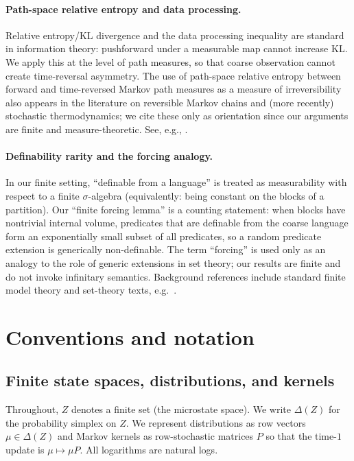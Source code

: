 \documentclass[11pt]{article}
\theoremstyle{remark}
\begin{document}
\paragraph{Path-space relative entropy and data processing.}
Relative entropy/KL divergence and the data processing inequality are standard in information theory:
pushforward under a measurable map cannot increase KL. We apply this at the level of path measures,
so that coarse observation cannot create time-reversal asymmetry.
The use of path-space relative entropy between forward and time-reversed Markov path measures as a
measure of irreversibility also appears in the literature on reversible Markov chains and (more
recently) stochastic thermodynamics; we cite these only as orientation since our arguments are finite
and measure-theoretic. See, e.g., \cite{CoverThomas2006,CsiszarKorner2011,Kelly1979,Seifert2012}.

\paragraph{Definability rarity and the forcing analogy.}
In our finite setting, ``definable from a language'' is treated as measurability with respect to a
finite $\sigma$-algebra (equivalently: being constant on the blocks of a partition). Our ``finite
forcing lemma'' is a counting statement: when blocks have nontrivial internal volume, predicates that
are definable from the coarse language form an exponentially small subset of all predicates, so a
random predicate extension is generically non-definable.
The term ``forcing'' is used only as an analogy to the role of generic extensions in set theory; our
results are finite and do not invoke infinitary semantics. Background references include standard
finite model theory and set-theory texts, e.g.\ \cite{Libkin2004,Cohen1963,Kunen2011}.

\section{Conventions and notation}
\subsection{Finite state spaces, distributions, and kernels}

Throughout, $Z$ denotes a finite set (the microstate space). We write $\Delta(Z)$ for the probability simplex on $Z$.
We represent distributions as row vectors $\mu \in \Delta(Z)$ and Markov kernels as row-stochastic matrices $P$ so that the time-$1$ update is $\mu \mapsto \mu P$.
All logarithms are natural logs.
\end{document}

